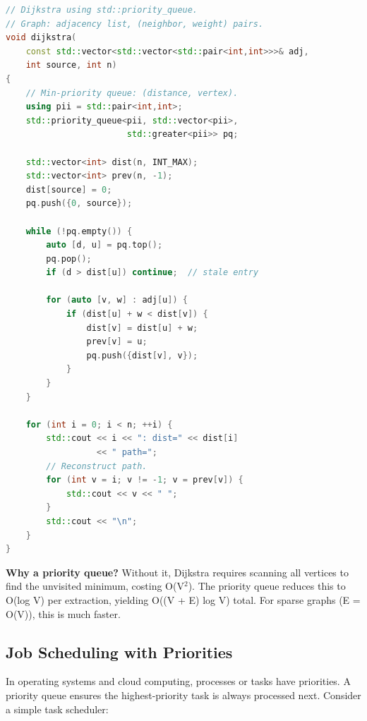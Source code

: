 \begin{lstlisting}[language=C++]
// Dijkstra using std::priority_queue.
// Graph: adjacency list, (neighbor, weight) pairs.
void dijkstra(
    const std::vector<std::vector<std::pair<int,int>>>& adj,
    int source, int n)
{
    // Min-priority queue: (distance, vertex).
    using pii = std::pair<int,int>;
    std::priority_queue<pii, std::vector<pii>,
                        std::greater<pii>> pq;

    std::vector<int> dist(n, INT_MAX);
    std::vector<int> prev(n, -1);
    dist[source] = 0;
    pq.push({0, source});

    while (!pq.empty()) {
        auto [d, u] = pq.top();
        pq.pop();
        if (d > dist[u]) continue;  // stale entry

        for (auto [v, w] : adj[u]) {
            if (dist[u] + w < dist[v]) {
                dist[v] = dist[u] + w;
                prev[v] = u;
                pq.push({dist[v], v});
            }
        }
    }

    for (int i = 0; i < n; ++i) {
        std::cout << i << ": dist=" << dist[i]
                  << " path=";
        // Reconstruct path.
        for (int v = i; v != -1; v = prev[v]) {
            std::cout << v << " ";
        }
        std::cout << "\n";
    }
}
\end{lstlisting}

\textbf{Why a priority queue?} Without it, Dijkstra requires scanning all vertices to find the unvisited minimum, costing O(V$^{2}$). The priority queue reduces this to O(log V) per extraction, yielding O((V + E) log V) total. For sparse graphs (E = O(V)), this is much faster.

\subsection{Job Scheduling with Priorities}

In operating systems and cloud computing, processes or tasks have priorities. A priority queue ensures the highest-priority task is always processed next. Consider a simple task scheduler:

